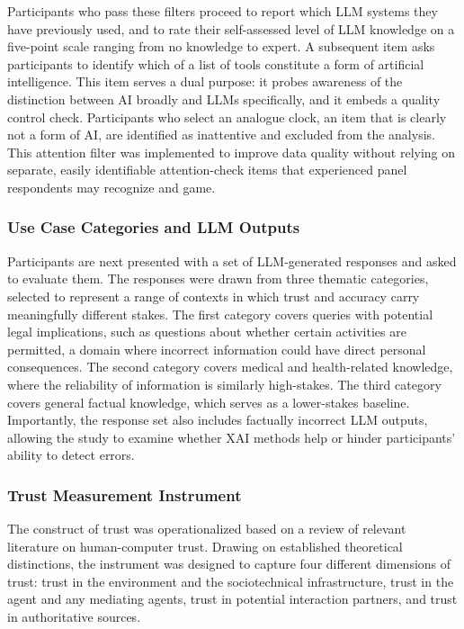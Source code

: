Participants who pass these filters proceed to report which LLM systems they have previously used, and to rate their self-assessed level of LLM knowledge on a five-point scale ranging from no knowledge to expert. A subsequent item asks participants to identify which of a list of tools constitute a form of artificial intelligence. This item serves a dual purpose: it probes awareness of the distinction between AI broadly and LLMs specifically, and it embeds a quality control check. Participants who select an analogue clock, an item that is clearly not a form of AI, are identified as inattentive and excluded from the analysis. This attention filter was implemented to improve data quality without relying on separate, easily identifiable attention-check items that experienced panel respondents may recognize and game.

\subsubsection{Use Case Categories and LLM Outputs}

Participants are next presented with a set of LLM-generated responses and asked to evaluate them. The responses were drawn from three thematic categories, selected to represent a range of contexts in which trust and accuracy carry meaningfully different stakes. The first category covers queries with potential legal implications, such as questions about whether certain activities are permitted, a domain where incorrect information could have direct personal consequences. The second category covers medical and health-related knowledge, where the reliability of information is similarly high-stakes. The third category covers general factual knowledge, which serves as a lower-stakes baseline. Importantly, the response set also includes factually incorrect LLM outputs, allowing the study to examine whether XAI methods help or hinder participants' ability to detect errors.

\subsubsection{Trust Measurement Instrument}

The construct of trust was operationalized based on a review of relevant literature on human-computer trust. Drawing on established theoretical distinctions, the instrument was designed to capture four different dimensions of trust: trust in the environment and the sociotechnical infrastructure, trust in the agent and any mediating agents, trust in potential interaction partners, and trust in authoritative sources\cite{castelfranchi_trust_2001}\cite{falcone_social_2001}\cite{jones_concept_2002}. 

